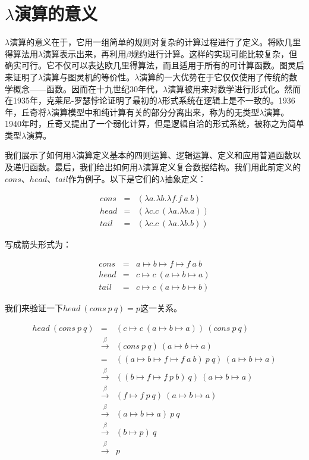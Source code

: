 \documentclass[b5paper]{ctexart}
\begin{document}
\section{\texorpdfstring{$\lambda$}{λ}演算的意义}

$\lambda$演算的意义在于，它用一组简单的规则对复杂的计算过程进行了定义。将欧几里得算法用$\lambda$演算表示出来，再利用$\beta$规约进行计算。这样的实现可能比较复杂，但确实可行。它不仅可以表达欧几里得算法，而且适用于所有的可计算函数。图灵后来证明了$\lambda$演算与图灵机的等价性。$\lambda$演算的一大优势在于它仅仅使用了传统的数学概念——函数。因而在十九世纪30年代，$\lambda$演算被用来对数学进行形式化。然而在1935年，克莱尼-罗瑟悖论证明了最初的$\lambda$形式系统在逻辑上是不一致的。1936年，丘奇将$\lambda$演算模型中和纯计算有关的部分分离出来，称为的无类型$\lambda$演算。1940年时，丘奇又提出了一个弱化计算，但是逻辑自洽的形式系统，被称之为简单类型$\lambda$演算。

我们展示了如何用$\lambda$演算定义基本的四则运算、逻辑运算、定义和应用普通函数以及递归函数。最后，我们给出如何用$\lambda$演算定义复合数据结构。我们用此前定义的$cons$、$head$、$tail$作为例子。以下是它们的$\lambda$抽象定义：

\[
\begin{array}{rcl}
cons & = & (\lambda a . \lambda b . \lambda f . f\ a\ b) \\
head & = & (\lambda c . c\ (\lambda a . \lambda b . a)) \\
tail & = & (\lambda c . c\ (\lambda a . \lambda b . b))
\end{array}
\]

写成箭头形式为：

\[
\begin{array}{rcl}
cons & = & a \mapsto b \mapsto f \mapsto f\ a\ b \\
head & = & c \mapsto c\ (a \mapsto b \mapsto a) \\
tail & = & c \mapsto c\ (a \mapsto b \mapsto b)
\end{array}
\]

我们来验证一下$head\ (cons\ p\ q) = p$这一关系。

\[
\begin{array}{rcl}
head\ (cons\ p\ q) & = & (c \mapsto c\ (a \mapsto b \mapsto a))\ (cons\ p\ q) \\
                   & \xrightarrow{\beta} & (cons\ p\ q)\ (a \mapsto b \mapsto a) \\
                   & = & ((a \mapsto b \mapsto f \mapsto f\ a\ b)\ p\ q)\ (a \mapsto b \mapsto a) \\
                   & \xrightarrow{\beta} & ((b \mapsto f \mapsto f\ p\ b)\ q)\ (a \mapsto b \mapsto a) \\
                   & \xrightarrow{\beta} & (f \mapsto f\ p\ q)\ (a \mapsto b \mapsto a) \\
                   & \xrightarrow{\beta} & (a \mapsto b \mapsto a)\ p\ q \\
                   & \xrightarrow{\beta} & (b \mapsto p)\ q \\
                   & \xrightarrow{\beta} & p
\end{array}
\]
\end{document}
